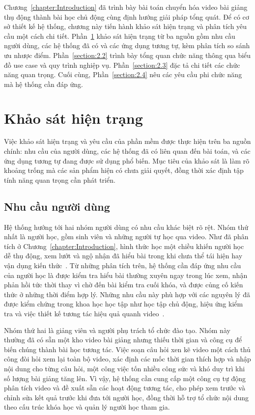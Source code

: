 \documentclass[../DoAn.tex]{subfiles}
\begin{document}
Chương~\ref{chapter:Introduction} đã trình bày bài toán chuyển hóa video bài giảng thụ động thành bài học chủ động cùng định hướng giải pháp tổng quát. Để có cơ sở thiết kế hệ thống, chương này tiến hành khảo sát hiện trạng và phân tích yêu cầu một cách chi tiết. Phần~\ref{section:2.1} khảo sát hiện trạng từ ba nguồn gồm nhu cầu người dùng, các hệ thống đã có và các ứng dụng tương tự, kèm phân tích so sánh ưu nhược điểm. Phần~\ref{section:2.2} trình bày tổng quan chức năng thông qua biểu đồ use case và quy trình nghiệp vụ. Phần~\ref{section:2.3} đặc tả chi tiết các chức năng quan trọng. Cuối cùng, Phần~\ref{section:2.4} nêu các yêu cầu phi chức năng mà hệ thống cần đáp ứng.

\section{Khảo sát hiện trạng}
\label{section:2.1}
Việc khảo sát hiện trạng và yêu cầu của phần mềm được thực hiện trên ba nguồn chính: nhu cầu của người dùng, các hệ thống đã có liên quan đến bài toán, và các ứng dụng tương tự đang được sử dụng phổ biến. Mục tiêu của khảo sát là làm rõ khoảng trống mà các sản phẩm hiện có chưa giải quyết, đồng thời xác định tập tính năng quan trọng cần phát triển.

\subsection{Nhu cầu người dùng}
\label{subsection:2.1.1}
Hệ thống hướng tới hai nhóm người dùng có nhu cầu khác biệt rõ rệt. Nhóm thứ nhất là người học, gồm sinh viên và những người tự học qua video. Như đã phân tích ở Chương~\ref{chapter:Introduction}, hình thức học một chiều khiến người học dễ thụ động, xem lướt và ngộ nhận đã hiểu bài trong khi chưa thể tái hiện hay vận dụng kiến thức~\cite{prince2004active,karpicke2008critical}. Từ những phân tích trên, hệ thống cần đáp ứng nhu cầu của người học là được kiểm tra hiểu bài thường xuyên ngay trong lúc xem, nhận phản hồi tức thời thay vì chờ đến bài kiểm tra cuối khóa, và được củng cố kiến thức ở những thời điểm hợp lý. Những nhu cầu này phù hợp với các nguyên lý đã được kiểm chứng trong khoa học học tập như học tập chủ động, hiệu ứng kiểm tra và việc thiết kế tương tác hiệu quả quanh video~\cite{brame2016effective}.

Nhóm thứ hai là giảng viên và người phụ trách tổ chức đào tạo. Nhóm này thường đã có sẵn một kho video bài giảng nhưng thiếu thời gian và công cụ để biến chúng thành bài học tương tác. Việc soạn câu hỏi xen kẽ video một cách thủ công đòi hỏi xem lại toàn bộ video, xác định các mốc thời gian thích hợp và nhập nội dung cho từng câu hỏi, một công việc tốn nhiều công sức và khó duy trì khi số lượng bài giảng tăng lên. Vì vậy, hệ thống cần cung cấp một công cụ tự động phân tích video và đề xuất sẵn các hoạt động tương tác, cho phép xem trước và chỉnh sửa kết quả trước khi đưa tới người học, đồng thời hỗ trợ tổ chức nội dung theo cấu trúc khóa học và quản lý người học tham gia.
\end{document}
